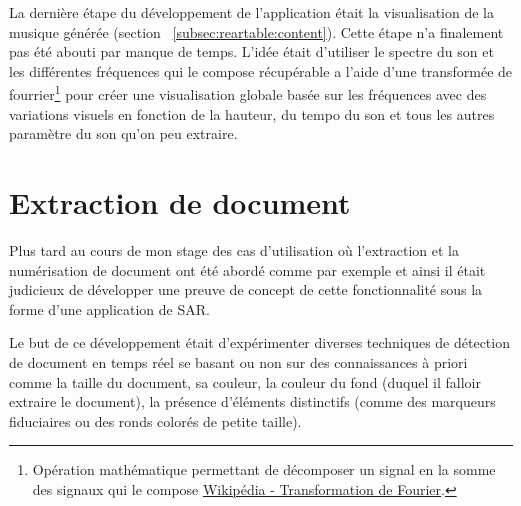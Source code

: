 La dernière étape du développement de l'application était la visualisation de la musique générée (section ~\ref{subsec:reartable:content}). Cette étape n'a finalement pas été abouti par manque de temps. L'idée était d'utiliser le spectre du son et les différentes fréquences qui le compose récupérable a l'aide d'une transformée de fourrier\footnote{Opération mathématique permettant de décomposer un signal en la somme des signaux qui le compose \href{https://fr.wikipedia.org/wiki/Transformation_de_Fourier}{Wikipédia - Transformation de Fourier}.} pour créer une visualisation globale basée sur les fréquences avec des variations visuels en fonction de la hauteur, du tempo du son et tous les autres paramètre du son qu'on peu extraire.



\section{Extraction de document}
\label{sec:document}
Plus tard au cours de mon stage des cas d'utilisation où l'extraction et la numérisation de document ont été abordé comme par exemple %
et ainsi il était judicieux de développer une preuve de concept de cette fonctionnalité sous la forme d'une application de SAR.

Le but de ce développement était d'expérimenter diverses techniques de détection de document en temps réel se basant ou non sur des connaissances à priori comme la taille du document, sa couleur, la couleur du fond (duquel il falloir extraire le document), la présence d’éléments distinctifs (comme des marqueurs fiduciaires ou des ronds colorés de petite taille).

